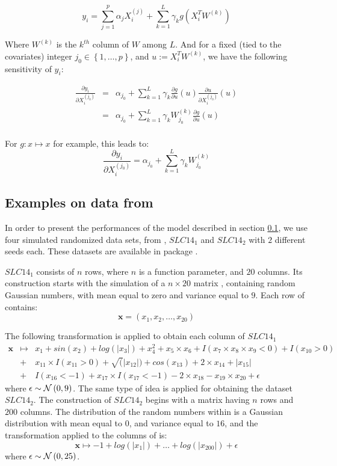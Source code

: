 $$
y_i = \sum_{j = 1}^p \alpha_j X_i^{(j)} + \sum_{k = 1}^L \gamma_k g(X_i^T W^{(k)})
$$

Where $W^{(k)}$ is the $k^{th}$ column of $W$ among $L$. And for a fixed (tied to the covariates) integer $j_0 \in \left \lbrace 1, \ldots, p \right \rbrace$, and $u := X_i^T W^{(k)}$, we have the following sensitivity of $y_i$: 

\begin{eqnarray*}
\frac{\partial y_i}{\partial X_i^{(j_0)}} &=& \alpha_{j_0} + \sum_{k = 1}^L \gamma_k \frac{\partial g}{\partial u}(u)\frac{\partial u}{\partial X_i^{(j_0)}}(u) \\
 &=& \alpha_{j_0} + \sum_{k = 1}^L \gamma_k W_{j_0}^{(k)} \frac{\partial g}{\partial u}(u)\\
\end{eqnarray*}

For $g: x \mapsto x$ for example, this leads to: 
$$
\frac{\partial y_i}{\partial X_i^{(j_0)}} = \alpha_{j_0} + \sum_{k = 1}^L \gamma_k W_{j_0}^{(k)}
$$

\newpage

\subsection{Examples on data from \cite{sapp2014subsemble}}
\label{sec:sapp2014}

In order to present the performances of the model described in section \ref{sec:sapp2014}, we use four simulated randomized data sets, from \cite{sapp2014subsemble}, $SLC14_1$ and $SLC14_2$ with $2$ different seeds each. These datasets are available in  package . 

$SLC14_1$ consists of $n$ rows, where $n$ is a function parameter, and $20$ columns. Its construction starts with the simulation of a $n \times 20$ matrix , containing random Gaussian numbers, with mean equal to zero and variance equal to $9$. Each row of  contains: 
$$
\textbf{x} = \left( x_1, x_2, \ldots, x_{20}\right) 
$$

The following transformation is applied to obtain each column of $SLC14_1$
\begin{eqnarray*}
 \textbf{x} &\mapsto& x_1 + sin(x_2) + log(|x_3|) + x_4^2 + x_5 \times x_6 +
I(x_7 \times x_8 \times x_9 < 0) + I(x_{10} > 0) \\
&+& x_{11} \times I(x_{11} > 0) + \sqrt(|x_{12}|) +
cos(x_{13}) + 2 \times x_{14} + |x_{15}| \\ 
&+& I(x_{16} < -1) + x_{17} \times I(x_{17} < -1) - 2  \times  x_{18}
- x_{19} \times x_{20} + \epsilon
\end{eqnarray*}
where $\epsilon \sim \mathcal{N}\left(0, 9\right)$. The same type of idea is applied for obtaining the dataset $SLC14_2$. The construction of $SLC14_2$ begins with a matrix  having $n$ rows and $200$ columns. The distribution of the random numbers within  is a Gaussian distribution with mean equal to $0$, and variance equal to $16$, and the transformation applied to the columns of  is: 
$$
\textbf{x} \mapsto -1 + log(|x_1|) + \ldots + log(|x_{200}|)  + \epsilon
$$
where $\epsilon \sim \mathcal{N}\left(0, 25\right)$.

